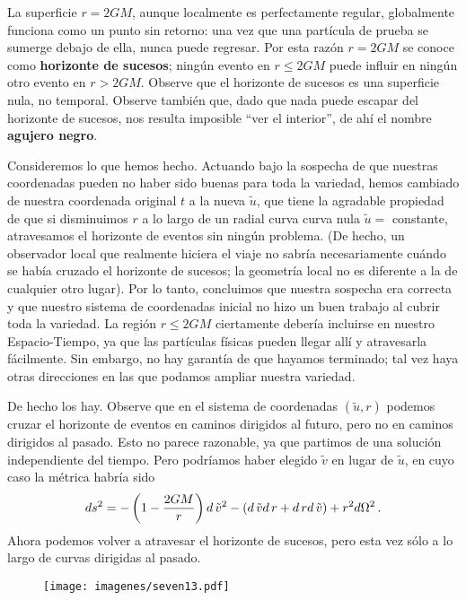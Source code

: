 \documentclass[11pt,b5paper,openany,twoside]{book}
\begin{document}
La superficie $r=2GM$, aunque localmente es perfectamente regular, globalmente funciona como un punto sin retorno: una vez que una partícula de prueba se sumerge debajo de ella, nunca puede regresar.
Por esta razón $r=2GM$ se conoce como {\bf horizonte de sucesos}; ningún evento en $r\leq 2GM$ puede influir en ningún otro evento en $r>2GM$.
Observe que el horizonte de sucesos es una superficie nula, no temporal.
Observe también que, dado que nada puede escapar del horizonte de sucesos, nos resulta imposible ``ver el interior'', de ahí el nombre {\bf agujero negro}.

Consideremos lo que hemos hecho.
Actuando bajo la sospecha de que nuestras coordenadas pueden no haber sido buenas para toda la variedad, hemos cambiado de nuestra coordenada original $t$ a la nueva $\tilde u$, que tiene la agradable propiedad de que si disminuimos $r$ a lo largo de un radial curva curva nula $\tilde u =$ constante, atravesamos el horizonte de eventos sin ningún problema.
(De hecho, un observador local que realmente hiciera el viaje no sabría necesariamente cuándo se había cruzado el horizonte de sucesos; la geometría local no es diferente a la de cualquier otro lugar).
Por lo tanto, concluimos que nuestra sospecha era correcta y que nuestro sistema de coordenadas inicial no hizo un buen trabajo al cubrir toda la variedad.
La región $r\leq 2GM$ ciertamente debería incluirse en nuestro Espacio-Tiempo, ya que las partículas físicas pueden llegar allí y atravesarla fácilmente.
Sin embargo, no hay garantía de que hayamos terminado; tal vez haya otras direcciones en las que podamos ampliar nuestra variedad.

De hecho los hay.
Observe que en el sistema de coordenadas $(\tilde u, r)$ podemos cruzar el horizonte de eventos en caminos dirigidos al futuro, pero no en caminos dirigidos al pasado.
Esto no parece razonable, ya que partimos de una solución independiente del tiempo.
Pero podríamos haber elegido $\tilde v$ en lugar de $\tilde u$, en cuyo caso la métrica habría sido
\begin{equation}
ds^2 = -\left(1-{{2GM}\over r}\right) d\,{\tilde v}^2
-( d\,\tilde v d\,r +  d\,r d\,\tilde v) + r^2 d\Omega^2\,.\label{7.72}
\end{equation}
Ahora podemos volver a atravesar el horizonte de sucesos, pero esta vez sólo a lo largo de curvas dirigidas al pasado.

\begin{figure}[h]
\centering
\texttt{[image: imagenes/seven13.pdf]}
\end{figure}
\end{document}
